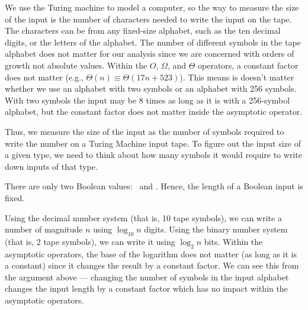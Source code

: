 \begin{schemeregion}
We use the Turing machine to model a computer, so the way to measure the size of the input is the number of characters needed to write the input on the tape.  The characters can be from any fixed-size alphabet, such as the ten decimal digits, or the letters of the alphabet.  %
The number of different symbols in the tape alphabet does not matter for our analysis since we are concerned with orders of growth not absolute values.  Within the $O$, $\Omega$, and $\Theta$ operators, a constant factor does not matter (e.g., $\Theta(n) \equiv \Theta(17n+523)$).  This means is doesn't matter whether we use an alphabet with two symbols or an alphabet with 256 symbols.  With two symbols the input may be 8 times as long as it is with a 256-symbol alphabet, but the constant factor does not matter inside the asymptotic operator.

Thus, we measure the size of the input as the number of symbols required to write the number on a Turing Machine input tape.  To figure out the input size of a given type, we need to think about how many symbols it would require to write down inputs of that type.

 There are only two Boolean values: \true\ and \false.  Hence, the length of a Boolean input is fixed.

 Using the decimal number system (that is, 10 tape symbols), we can write a number of magnitude $n$ using $\log_{10} n$ digits.  Using the binary number system (that is, 2 tape symbols), we can write it using $\log_{2} n$ bits.  Within the asymptotic operators, the base of the logarithm does not matter (as long as it is a constant) since it changes the result by a constant factor.  We can see this from the argument above --- changing the number of symbols in the input alphabet changes the input length by a constant factor which has no impact within the asymptotic operators.  


\end{schemeregion}
